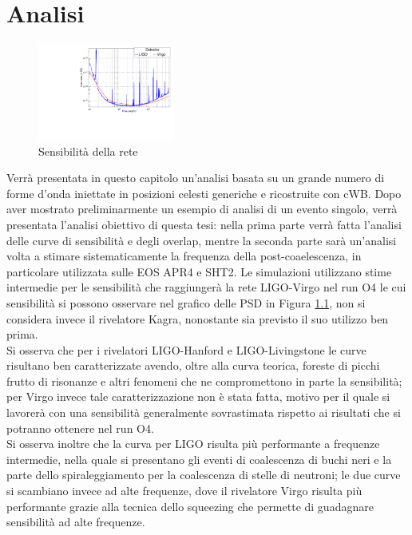 \chapter{Analisi}
\label{chapter:analisi}
\begin{figure}
	\vspace{-10pt}
	\begin{center}
		\includegraphics[width=0.4\textwidth]{figures/Capitolo_4/report/pds.pdf}
	\end{center}
	\vspace{-5pt}
	\caption{Sensibilità della rete}
	\label{fig:sensitivity_O4}
	\vspace{-10pt}
\end{figure}
Verrà presentata in questo capitolo un'analisi basata su un grande numero di forme d'onda iniettate in posizioni celesti generiche e ricostruite con cWB. Dopo aver mostrato preliminarmente un esempio di analisi di un evento singolo, verrà presentata l'analisi obiettivo di questa tesi: nella prima parte verrà fatta l'analisi delle curve di sensibilità e degli overlap, mentre la seconda parte sarà un'analisi volta a stimare sistematicamente la frequenza della post-coaelescenza, in particolare utilizzata sulle EOS APR4 e SHT2.
Le simulazioni utilizzano stime intermedie per le sensibilità che raggiungerà la rete LIGO-Virgo nel run O4 le cui sensibilità si possono osservare nel grafico delle PSD in Figura \ref{fig:sensitivity_O4}, non si considera invece il rivelatore Kagra, nonostante sia previsto il suo utilizzo ben prima.\\
Si osserva che per i rivelatori LIGO-Hanford e LIGO-Livingstone le curve risultano ben caratterizzate avendo, oltre alla curva teorica, foreste di picchi frutto di risonanze e altri fenomeni che ne compromettono in parte la sensibilità; per Virgo invece tale caratterizzazione non è stata fatta, motivo per il quale si lavorerà con una sensibilità generalmente sovrastimata rispetto ai risultati che si potranno ottenere nel run O4.\\
Si osserva inoltre che la curva per LIGO risulta più performante a frequenze intermedie, nella quale si presentano gli eventi di coalescenza di buchi neri e la parte dello spiraleggiamento per la coalescenza di stelle di neutroni; le due curve si scambiano invece ad alte frequenze, dove il rivelatore Virgo risulta più performante grazie alla tecnica dello squeezing che permette di guadagnare sensibilità ad alte frequenze.
